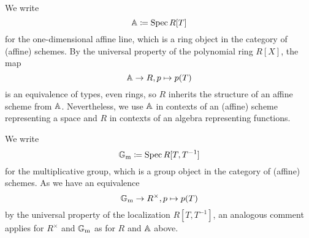 We write
\begin{equation*}
  \mathbb{A} \coloneqq \operatorname{Spec} R[T]
\end{equation*}
for the one-dimensional affine line, which is a ring object in the
category of (affine) schemes.  By the universal property of the polynomial
ring $R[X]$, the map
\begin{equation*}
  \mathbb{A} \to R, p \mapsto p(T)
\end{equation*}
is an equivalence of types, even rings, so $R$
inherits the structure of an affine scheme from $\mathbb{A}$.  Nevertheless,
we use $\mathbb{A}$ in contexts of an (affine) scheme representing a space and
$R$ in contexts of an algebra representing functions.

We write
\begin{equation*}
  \mathbb{G}_\mathrm{m} \coloneqq \operatorname{Spec} R[T, T^{-1}]
\end{equation*}
for the multiplicative group, which is a group object in the category of (affine) schemes.  As we have an equivalence
\begin{equation*}
  \mathbb{G}_\mathrm{m} \to R^\times, p \mapsto p(T)
\end{equation*}
by the universal property of the localization $R[T, T^{-1}]$, an
analogous comment applies for $R^\times$ and $\mathbb{G}_\mathrm{m}$ as for $R$ and $\mathbb{A}$
above.

